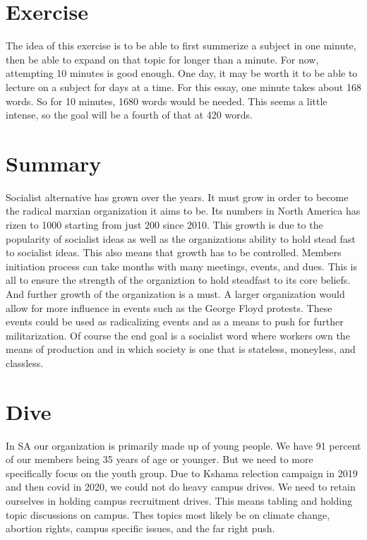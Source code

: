 \documentclass{article}
\title{SA bulletin #146}
\author{Long Nguyen}
\date{March 2023}
\begin{document}
\maketitle

\section{Exercise}
The idea of this exercise is to be able to first summerize a subject in one minute, then be able to expand on that topic for longer than a minute. For now, attempting 10 minutes is good enough. One day, it may be worth it to be able to lecture on a subject for days at a time. For this essay, one minute takes about 168 words. So for 10 minutes, 1680 words would be needed. This seems a little intense, so the goal will be a fourth of that at 420 words.

\section{Summary}
Socialist alternative has grown over the years. It must grow in order to become the radical marxian organization it aims to be. Its numbers in North America has rizen to 1000 starting from just 200 since 2010. This growth is due to the popularity of socialist ideas as well as the organizations ability to hold stead fast to socialist ideas. This also means that growth has to be controlled. Members initiation process can take months with many meetings, events, and dues. This is all to ensure the strength of the organiztion to hold steadfast to its core beliefs. And further growth of the organization is a must. A larger organization would allow for more influence in events such as the George Floyd protests. These events could be used as radicalizing events and as a means to push for further militarization. Of course the end goal is a socialist word where workers own the means of production and in which society is one that is stateless, moneyless, and classless.

\section{Dive}
In SA our organization is primarily made up of young people. We have 91 percent of our members being 35 years of age or younger. But we need to more specifically focus on the youth group. Due to Kshama relection campaign in 2019 and then covid in 2020, we could not do heavy campus drives. We need to retain ourselves in holding campus recruitment drives. This means tabling and holding topic discussions on campus. Thes topics most likely be on climate change, abortion rights, campus specific issues, and the far right push.
\end{document}
